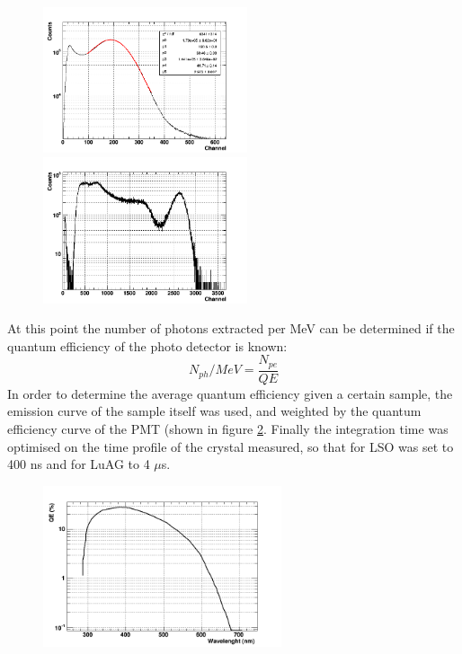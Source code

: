 \begin{figure}[htbp]
\begin{center}
\includegraphics[width=6cm]{../Pictures/Chapter_5/single.png}
\includegraphics[width=6cm]{../Pictures/Chapter_5/spectrum_LY.png}
\end{center}
\caption[]{}
\label{fig:spectrum}
\end{figure}
At this point the number of photons extracted per MeV can be determined if the quantum efficiency of the photo detector is known:
\begin{equation}
N_{ph}/MeV=\frac{N_{pe}}{QE}
\end{equation}
In order to determine the average quantum efficiency given a certain sample, the emission curve of the sample itself was used, and weighted by the quantum efficiency curve of the PMT (shown in figure \ref{fig:QE}.
Finally the integration time was optimised on the time profile of the crystal measured, so that for LSO was set to 400 ns and for LuAG to 4 $\mu$s.
\begin{figure}[htbp]
\begin{center}
\includegraphics[width=7cm]{../Pictures/Chapter_5/qe.png}
\end{center}
\caption[]{}
\label{fig:QE}
\end{figure}
